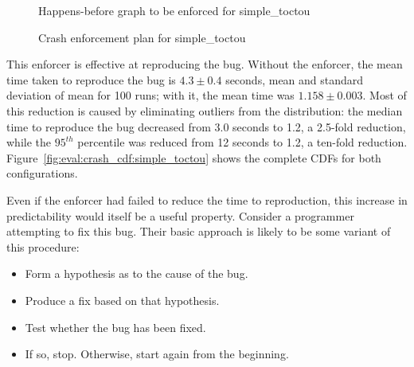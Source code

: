\begin{figure}
  \caption{Happens-before graph to be enforced for simple\_toctou}
  \label{fig:eval:simple_toctou:hb_graph}
\end{figure}

\begin{figure}
  \caption{Crash enforcement plan for simple\_toctou}
  \label{fig:eval:simple_toctou:enforce_plan}
\end{figure}

This enforcer is effective at reproducing the bug.  Without the
enforcer, the mean time taken to reproduce the bug is $4.3 \pm 0.4$
seconds, mean and standard deviation of mean for 100 runs; with it,
the mean time was $1.158 \pm 0.003$.  Most of this reduction is caused
by eliminating outliers from the distribution: the median time to
reproduce the bug decreased from 3.0 seconds to 1.2, a 2.5-fold
reduction, while the $95^{th}$ percentile was reduced from 12 seconds
to 1.2, a ten-fold reduction.
Figure~\ref{fig:eval:crash_cdf:simple_toctou} shows the complete CDFs
for both configurations.

Even if the enforcer had failed to reduce the time to reproduction,
this increase in predictability would itself be a useful property.
Consider a programmer attempting to fix this bug.  Their basic
approach is likely to be some variant of this procedure:

\begin{itemize}
\item Form a hypothesis as to the cause of the bug.
\item Produce a fix based on that hypothesis.
\item Test whether the bug has been fixed.
\item If so, stop.  Otherwise, start again from the beginning.
\end{itemize}

